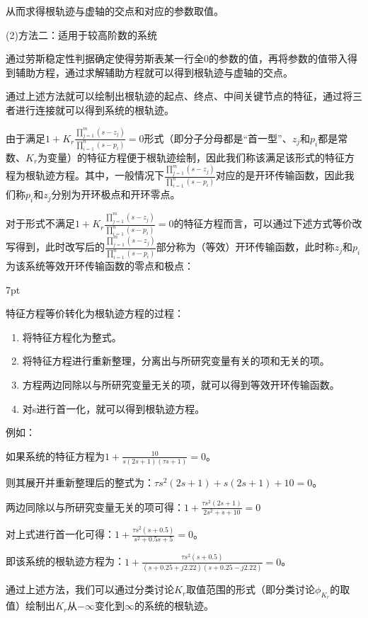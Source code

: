\documentclass{article}
\numberwithin{equation}{section}
\numberwithin{figure}{section}
\newenvironment{formal}{%
\def\FrameCommand{%
\hspace{1pt}%
{\color{DarkBlue}\vrule width 2pt}%
{\color{formalshade}\vrule width 4pt}%
\colorbox{formalshade}%
}%
\MakeFramed{\advance\hsize-\width\FrameRestore}%
\noindent\hspace{-4.55pt}%
\begin{adjustwidth}{}{7pt}%
\vspace{2pt}\vspace{2pt}%
}
{%
\vspace{2pt}\end{adjustwidth}\endMakeFramed%
}
\begin{document}
从而求得根轨迹与虚轴的交点和对应的参数取值。

(2)方法二：适用于较高阶数的系统

通过劳斯稳定性判据确定使得劳斯表某一行全0的参数的值，再将参数的值带入得到辅助方程，通过求解辅助方程就可以得到根轨迹与虚轴的交点。

通过上述方法就可以绘制出根轨迹的起点、终点、中间关键节点的特征，通过将三者进行连接就可以得到系统的根轨迹。

由于满足$1+K_r\frac{\prod_{j=1}^{m}(s-z_j)}{\prod_{i=1}^{n}(s-p_i)}=0$形式（即分子分母都是“首一型”、$z_j$和$p_i$都是常数、$K_r$为变量）的特征方程便于根轨迹绘制，因此我们称该满足该形式的特征方程为根轨迹方程。其中，一般情况下$\frac{\prod_{j=1}^{m}(s-z_j)}{\prod_{i=1}^{n}(s-p_i)}$对应的是开环传输函数，因此我们称$p_i$和$z_j$分别为开环极点和开环零点。

对于形式不满足$1+K_r\frac{\prod_{j=1}^{m}(s-z_j)}{\prod_{i=1}^{n}(s-p_i)}=0$的特征方程而言，可以通过下述方式等价改写得到，此时改写后的$\frac{\prod_{j=1}^{m}(s-z_j)}{\prod_{i=1}^{n}(s-p_i)}$部分称为（等效）开环传输函数，此时称$z_j$和$p_i$为该系统等效开环传输函数的零点和极点：

\begin{formal}
    特征方程等价转化为根轨迹方程的过程：
\begin{enumerate}
    \item 将特征方程化为整式。
    \item 将特征方程进行重新整理，分离出与所研究变量有关的项和无关的项。
    \item 方程两边同除以与所研究变量无关的项，就可以得到等效开环传输函数。
    \item 对s进行首一化，就可以得到根轨迹方程。
\end{enumerate}

例如：

如果系统的特征方程为$1+\frac{10}{s(2s+1)(\tau s+1)}=0$。

则其展开并重新整理后的整式为：$\tau s^2(2s+1)+s(2s+1)+10=0$。

两边同除以与所研究变量无关的项可得：$1+\frac{\tau s^2(2s+1)}{2s^2+s+10}=0$

对上式进行首一化可得：$1+\frac{\tau s^2(s+0.5)}{s^2+0.5s+5}=0$。

即该系统的根轨迹方程为：$1+\frac{\tau s^2(s+0.5)}{(s+0.25+j2.22)(s+0.25-j2.22)}=0$。
\end{formal}

通过上述方法，我们可以通过分类讨论$K_r$取值范围的形式（即分类讨论$\phi_{K_r}$的取值）绘制出$K_r$从$-\infty$变化到$\infty$的系统的根轨迹。
\end{document}
